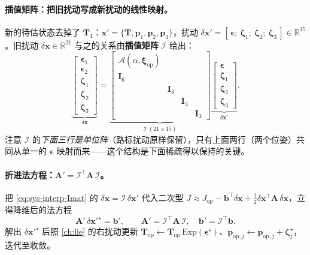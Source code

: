 \paragraph{插值矩阵：把旧扰动写成新扰动的线性映射。}
新的待估状态去掉了 $\mathbf{T}_1$：$\mathbf{x}'=\{\mathbf{T},\mathbf{p}_1,\mathbf{p}_2,\mathbf{p}_3\}$，扰动 $\delta\mathbf{x}'=[\,\boldsymbol\epsilon;\ \boldsymbol\zeta_1;\ \boldsymbol\zeta_2;\ \boldsymbol\zeta_3\,]\in\mathbb{R}^{15}$。旧扰动 $\delta\mathbf{x}\in\mathbb{R}^{21}$ 与之的关系由\textbf{插值矩阵} $\boldsymbol{\mathcal{I}}$ 给出：
\begin{equation}
\underbrace{\begin{bmatrix}\boldsymbol\epsilon_1\\ \boldsymbol\epsilon_2\\ \boldsymbol\zeta_1\\ \boldsymbol\zeta_2\\ \boldsymbol\zeta_3\end{bmatrix}}_{\delta\mathbf{x}}
=\underbrace{\begin{bmatrix}
\boldsymbol{\mathcal{A}}(\alpha,\boldsymbol\xi_{\mathrm{op}}) & & & \\
\mathbf{I}_6 & & & \\
 & \mathbf{I}_3 & & \\
 & & \mathbf{I}_3 & \\
 & & & \mathbf{I}_3
\end{bmatrix}}_{\boldsymbol{\mathcal{I}}\ (21\times15)}
\underbrace{\begin{bmatrix}\boldsymbol\epsilon\\ \boldsymbol\zeta_1\\ \boldsymbol\zeta_2\\ \boldsymbol\zeta_3\end{bmatrix}}_{\delta\mathbf{x}'}.
\label{eq:sys-interp-Imat}
\end{equation}
注意 $\boldsymbol{\mathcal{I}}$ 的\emph{下面三行是单位阵}（路标扰动原样保留），只有上面两行（两个位姿）共同从单一的 $\boldsymbol\epsilon$ 映射而来——这个结构是下面稀疏得以保持的关键。

\paragraph{折进法方程：$\mathbf{A}'=\boldsymbol{\mathcal{I}}^\top\mathbf{A}\,\boldsymbol{\mathcal{I}}$。}
把 \cref{eq:sys-interp-Imat} 的 $\delta\mathbf{x}=\boldsymbol{\mathcal{I}}\,\delta\mathbf{x}'$ 代入二次型 $J\approx J_{\mathrm{op}}-\mathbf{b}^\top\delta\mathbf{x}+\tfrac12\delta\mathbf{x}^\top\mathbf{A}\,\delta\mathbf{x}$，立得降维后的法方程
\begin{equation}
\mathbf{A}'\,\delta\mathbf{x}'^\star=\mathbf{b}',\qquad
\mathbf{A}'=\boldsymbol{\mathcal{I}}^\top\mathbf{A}\,\boldsymbol{\mathcal{I}},\quad
\mathbf{b}'=\boldsymbol{\mathcal{I}}^\top\mathbf{b}.
\label{eq:sys-interp-reduced}
\end{equation}
解出 $\delta\mathbf{x}'^\star$ 后照 \cref{ch:lie} 的右扰动更新 $\mathbf{T}_{\mathrm{op}}\leftarrow\mathbf{T}_{\mathrm{op}}\,\mathrm{Exp}(\boldsymbol\epsilon^\star)$、$\mathbf{p}_{\mathrm{op},j}\leftarrow\mathbf{p}_{\mathrm{op},j}+\boldsymbol\zeta_j^\star$，迭代至收敛。

